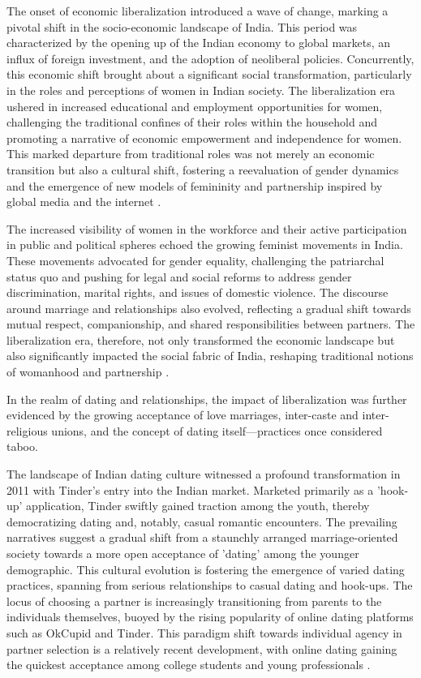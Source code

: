 The onset of economic liberalization introduced a wave of change, marking a pivotal shift in the socio-economic landscape of India. This period was characterized by the opening up of the Indian economy to global markets, an influx of foreign investment, and the adoption of neoliberal policies. Concurrently, this economic shift brought about a significant social transformation, particularly in the roles and perceptions of women in Indian society. The liberalization era ushered in increased educational and employment opportunities for women, challenging the traditional confines of their roles within the household and promoting a narrative of economic empowerment and independence for women. This marked departure from traditional roles was not merely an economic transition but also a cultural shift, fostering a reevaluation of gender dynamics and the emergence of new models of femininity and partnership inspired by global media and the internet \cite{Forbes_2020}.

The increased visibility of women in the workforce and their active participation in public and political spheres echoed the growing feminist movements in India. These movements advocated for gender equality, challenging the patriarchal status quo and pushing for legal and social reforms to address gender discrimination, marital rights, and issues of domestic violence. The discourse around marriage and relationships also evolved, reflecting a gradual shift towards mutual respect, companionship, and shared responsibilities between partners. The liberalization era, therefore, not only transformed the economic landscape but also significantly impacted the social fabric of India, reshaping traditional notions of womanhood and partnership \cite{statista_internet_users_2050}.

In the realm of dating and relationships, the impact of liberalization was further evidenced by the growing acceptance of love marriages, inter-caste and inter-religious unions, and the concept of dating itself—practices once considered taboo. 

The landscape of Indian dating culture witnessed a profound transformation in 2011 with Tinder's entry into the Indian market. Marketed primarily as a 'hook-up' application, Tinder swiftly gained traction among the youth, thereby democratizing dating and, notably, casual romantic encounters. The prevailing narratives suggest a gradual shift from a staunchly arranged marriage-oriented society towards a more open acceptance of 'dating' among the younger demographic. This cultural evolution is fostering the emergence of varied dating practices, spanning from serious relationships to casual dating and hook-ups. The locus of choosing a partner is increasingly transitioning from parents to the individuals themselves, buoyed by the rising popularity of online dating platforms such as OkCupid and Tinder. This paradigm shift towards individual agency in partner selection is a relatively recent development, with online dating gaining the quickest acceptance among college students and young professionals \cite{doshi_date_2016}.

